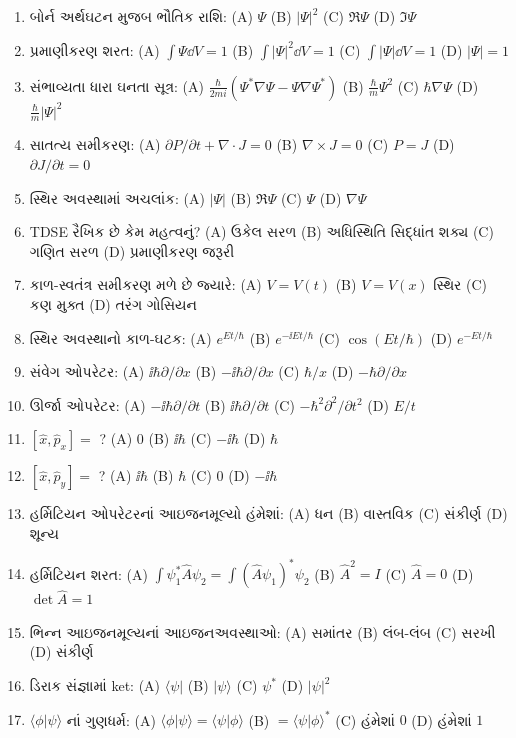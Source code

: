 \begin{enumerate}[label=\textbf{\arabic*.}]
  \item બોર્ન અર્થઘટન મુજબ ભૌતિક રાશિ: (A) $\Psi$ (B) $|\Psi|^{2}$ (C) $\Re\Psi$ (D) $\Im\Psi$
  \item પ્રમાણીકરણ શરત: (A) $\int\Psi\dd V=1$ (B) $\int|\Psi|^{2}\dd V=1$ (C) $\int|\Psi|\dd V=1$ (D) $|\Psi|=1$
  \item સંભાવ્યતા ધારા ઘનતા સૂત્ર: (A) $\frac{\hbar}{2mi}(\Psi^{*}\nabla\Psi-\Psi\nabla\Psi^{*})$ (B) $\frac{\hbar}{m}\Psi^{2}$ (C) $\hbar\nabla\Psi$ (D) $\frac{\hbar}{m}|\Psi|^{2}$
  \item સાતત્ય સમીકરણ: (A) $\partial P/\partial t+\nabla\cdot J=0$ (B) $\nabla\times J=0$ (C) $P=J$ (D) $\partial J/\partial t=0$
  \item સ્થિર અવસ્થામાં અચલાંક: (A) $|\Psi|$ (B) $\Re\Psi$ (C) $\Psi$ (D) $\nabla\Psi$
  \item TDSE રૈખિક છે કેમ મહત્વનું? (A) ઉકેલ સરળ (B) અધિસ્થિતિ સિદ્ધાંત શક્ય (C) ગણિત સરળ (D) પ્રમાણીકરણ જરૂરી
  \item કાળ-સ્વતંત્ર સમીકરણ મળે છે જ્યારે: (A) $V=V(t)$ (B) $V=V(x)$ સ્થિર (C) કણ મુક્ત (D) તરંગ ગોસિયન
  \item સ્થિર અવસ્થાનો કાળ-ઘટક: (A) $e^{Et/\hbar}$ (B) $e^{-\ii Et/\hbar}$ (C) $\cos(Et/\hbar)$ (D) $e^{-Et/\hbar}$
  \item સંવેગ ઓપરેટર: (A) $\ii\hbar\partial/\partial x$ (B) $-\ii\hbar\partial/\partial x$ (C) $\hbar/x$ (D) $-\hbar\partial/\partial x$
  \item ઊર્જા ઓપરેટર: (A) $-\ii\hbar\partial/\partial t$ (B) $\ii\hbar\partial/\partial t$ (C) $-\hbar^{2}\partial^{2}/\partial t^{2}$ (D) $E/t$
  \item $[\hat x,\hat p_x]=$ ? (A) $0$ (B) $\ii\hbar$ (C) $-\ii\hbar$ (D) $\hbar$
  \item $[\hat x,\hat p_y]=$ ? (A) $\ii\hbar$ (B) $\hbar$ (C) $0$ (D) $-\ii\hbar$
  \item હર્મિટિયન ઓપરેટરનાં આઇજનમૂલ્યો હંમેશાં: (A) ધન (B) વાસ્તવિક (C) સંકીર્ણ (D) શૂન્ય
  \item હર્મિટિયન શરત: (A) $\int\psi_1^{*}\hat A\psi_2=\int(\hat A\psi_1)^{*}\psi_2$ (B) $\hat A^2=I$ (C) $\hat A=0$ (D) $\det\hat A=1$
  \item ભિન્ન આઇજનમૂલ્યનાં આઇજનઅવસ્થાઓ: (A) સમાંતર (B) લંબ-લંબ (C) સરખી (D) સંકીર્ણ
  \item ડિરાક સંજ્ઞામાં ket: (A) $\langle\psi|$ (B) $|\psi\rangle$ (C) $\psi^{*}$ (D) $|\psi|^{2}$
  \item $\langle\phi|\psi\rangle$ નાં ગુણધર્મ: (A) $\langle\phi|\psi\rangle=\langle\psi|\phi\rangle$ (B) $=\langle\psi|\phi\rangle^{*}$ (C) હંમેશાં $0$ (D) હંમેશાં $1$

\end{enumerate}
